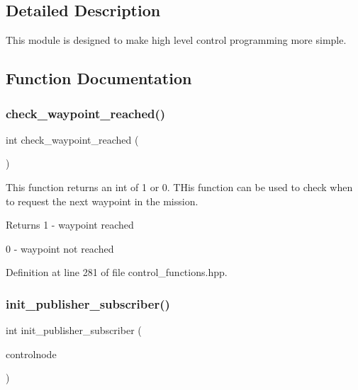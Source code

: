 \subsection{Detailed Description}
This module is designed to make high level control programming more simple. 

\subsection{Function Documentation}
\mbox{\label{group__control__functions_ga54abc3f6eae022a8710bc0c2e1c54fbe}} 
\subsubsection{\texorpdfstring{check\_waypoint\_reached()}{check\_waypoint\_reached()}}
{\footnotesize\ttfamily int check\+\_\+waypoint\+\_\+reached (\begin{DoxyParamCaption}{ }\end{DoxyParamCaption})}

This function returns an int of 1 or 0. T\+His function can be used to check when to request the next waypoint in the mission. \begin{DoxyReturn}{Returns}
1 -\/ waypoint reached 

0 -\/ waypoint not reached 
\end{DoxyReturn}


Definition at line 281 of file control\+\_\+functions.\+hpp.

\mbox{\label{group__control__functions_gae693b071b5392f9253cdfc1f4f362fcc}} 
\subsubsection{\texorpdfstring{init\_publisher\_subscriber()}{init\_publisher\_subscriber()}}
{\footnotesize\ttfamily int init\+\_\+publisher\+\_\+subscriber (\begin{DoxyParamCaption}\item[{ros\+::\+Node\+Handle}]{controlnode }\end{DoxyParamCaption})}


